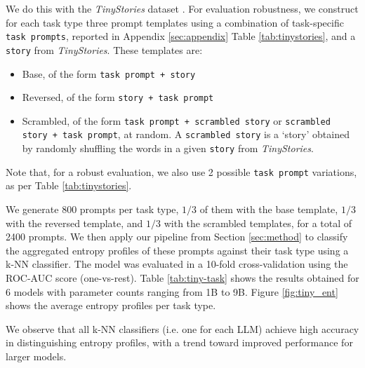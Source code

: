 We do this with the \textit{TinyStories} dataset \citep{eldan2023tinystories}. For evaluation robustness, we construct for each task type three prompt templates using a combination of task-specific \texttt{task prompts}, reported in Appendix \ref{sec:appendix} Table \ref{tab:tinystories}, and a \texttt{story} from \textit{TinyStories}. These templates are:
\begin{itemize}
    \item Base, of the form \texttt{task prompt + story}
    \item Reversed, of the form \texttt{story + task prompt}
    \item Scrambled, of the form \texttt{task prompt + scrambled story} or \texttt{scrambled story + task prompt}, at random. A \texttt{scrambled story} is a `story' obtained by randomly shuffling the words in a given \texttt{story} from \textit{TinyStories}.
\end{itemize}
Note that, for a robust evaluation, we also use 2 possible \texttt{task prompt} variations, as per Table \ref{tab:tinystories}.

We generate 800 prompts per task type, $1/3$ of them with the base template, $1/3$ with the reversed template, and $1/3$ with the scrambled templates, for a total of 2400 prompts. We then apply our pipeline from Section \ref{sec:method} to classify the aggregated entropy profiles of these prompts against their task type using a k-NN classifier. The model was evaluated in a 10-fold cross-validation using the ROC-AUC score (one-vs-rest). Table \ref{tab:tiny-task} shows the results obtained for 6 models with parameter counts ranging from 1B to 9B. Figure \ref{fig:tiny_ent} shows the average entropy profiles per task type.

We observe that all k-NN classifiers (i.e. one for each LLM) achieve high accuracy in distinguishing entropy profiles, with a trend toward improved performance for larger models. 

